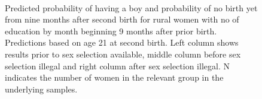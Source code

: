 \documentclass[12pt,letterpaper]{article}
\begin{document}
\begin{figure}[htpb]
{\begin{minipage}{0.31\textwidth}
        \captionsetup[subfigure]{labelformat=empty,position=top,captionskip=-1pt,farskip=-0.5pt}
        \\
        \captionsetup[subfigure]{labelformat=parens}
    \end{minipage}
}
\setcounter{subfigure}{3}
\caption{Predicted probability of having a boy and probability of
no birth yet from nine months after second birth for rural
women with no of education by month beginning 9 months after prior birth. 
Predictions based on age 21 at second birth.
Left column shows results prior to sex selection available, middle column before
sex selection illegal and right column after sex selection illegal.
N indicates the number of women in the relevant group in the underlying samples.
}
\label{fig:results_spell3_low_rural}
\end{figure}
\end{document}

